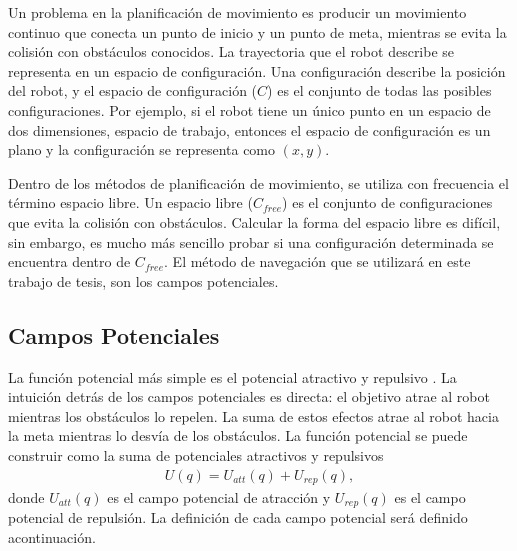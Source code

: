 Un problema en la planificación de movimiento es producir un movimiento 
continuo que conecta un punto de inicio y un punto de meta, mientras se evita 
la colisión con obstáculos conocidos. La trayectoria que el robot describe 
se representa en un espacio de configuración. Una configuración describe 
la posición del robot, y el espacio de configuración ($C$) es el conjunto 
de todas las posibles configuraciones. Por ejemplo, si el robot tiene 
un único punto en un espacio de dos dimensiones, espacio de trabajo, entonces 
el espacio de configuración es un plano y la configuración se representa 
como $(x,y)$.

Dentro de los métodos de planificación de movimiento, se utiliza con 
frecuencia el término espacio libre. Un espacio libre ($C_{free}$) es el 
conjunto de configuraciones que evita la colisión con obstáculos. Calcular 
la forma del espacio libre es difícil, sin embargo, es mucho más sencillo 
probar si una configuración determinada se encuentra dentro de $C_{free}$. El 
método de navegación que se utilizará en este trabajo de tesis, son los 
campos potenciales.

\subsection{Campos Potenciales}
\label{sec:Campos Potenciales}
La función potencial más simple es el potencial atractivo y repulsivo 
\cite{koren1991potential}. La intuición detrás de los campos potenciales es 
directa: el objetivo atrae al robot mientras los obstáculos lo repelen. La suma 
de estos efectos atrae al robot hacia la meta mientras lo desvía de los 
obstáculos. La función potencial se puede construir como la suma de potenciales 
atractivos y repulsivos
\begin{align}
\label{eqn:potetialField}
U(q) = U_{att}(q) + U_{rep}(q),
\end{align}
donde $U_{att}(q)$ es el campo potencial de atracción y $U_{rep}(q)$ es el campo
potencial de repulsión. La definición de cada campo potencial será definido 
acontinuación.

